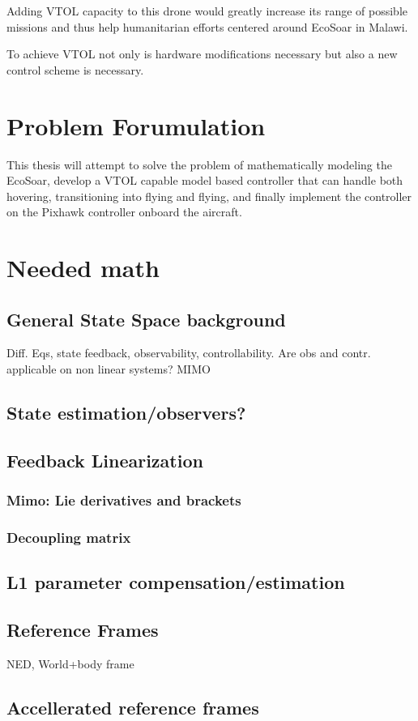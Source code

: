 \documentclass{article}
\begin{document}
Adding VTOL capacity to this drone would greatly increase its range of possible missions and thus help humanitarian efforts centered around EcoSoar in Malawi.

To achieve VTOL not only is hardware modifications necessary but also a new control scheme is necessary.

\section{Problem Forumulation}
This thesis will attempt to solve the problem of mathematically modeling the EcoSoar, develop a VTOL capable model based controller that can handle both hovering, transitioning into flying and flying, and finally implement the controller on the Pixhawk controller onboard the aircraft.

\section{Needed math}
\subsection{General State Space background}
Diff. Eqs, state feedback, observability, controllability.
Are obs and contr. applicable on non linear systems?
MIMO
\subsection{State estimation/observers?}
\subsection{Feedback Linearization}
\subsubsection{Mimo: Lie derivatives and brackets}
\subsubsection{Decoupling matrix}
\subsection{L1 parameter compensation/estimation}
\subsection{Reference Frames}
NED, World+body frame
\subsection{Accellerated reference frames}
\end{document}
